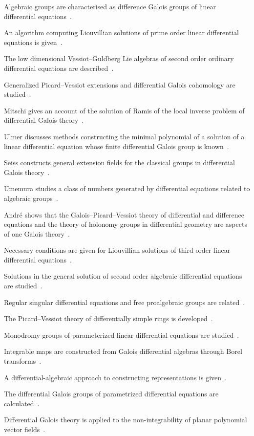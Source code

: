 Algebraic groups are characterised as difference Galois groups of linear
differential equations~\cite{WlAlgebraicGroupsAsDifferenceGal2020}.

An algorithm computing Liouvillian solutions of prime order linear
differential equations is given~\cite{WlAnAlgorithmToComputeLiouvillia2020}.

The low dimensional Vessiot--Guldberg Lie algebras of second order ordinary
differential equations are
described~\cite{WlLowDimensionalVessiotGuldbergL2020}.

Generalized Picard--Vessiot extensions and differential Galois cohomology are
studied~\cite{WlGeneralizedPicardVessiotExtens2020}.

Mitschi gives an account of the solution of Ramis of the local inverse problem of
differential Galois theory~\cite{WlOnRamisSSolutionOfTheLocalInve2020}.

Ulmer discusses methods constructing the minimal polynomial of a solution of a
linear differential equation whose finite differential Galois group is
known~\cite{WlNoteOnAlgebraicSolutionsOfDiff2020}.

Seiss constructs general extension fields for the classical groups in
differential Galois theory~\cite{WlOnGeneralExtensionFieldsForThe2020}.

Umemura studies a class of numbers generated by differential equations related
to algebraic groups~\cite{WlOnAClassOfNumbersGeneratedByDi2020}.

Andr\'e shows that the Galois--Picard--Vessiot theory of differential and
difference equations and the theory of holonomy groups in differential
geometry are aspects of one Galois
theory~\cite{WlNoncommutativeDifferentialsAnd2020}.

Necessary conditions are given for Liouvillian solutions of third order linear
differential equations~\cite{WlNecessaryConditionsForLiouvill2020}.

Solutions in the general solution of second order algebraic differential
equations are studied~\cite{WlSolutionsInTheGeneralSolutionO2020}.

Regular singular differential equations and free proalgebraic groups are
related~\cite{WlRegularSingularDifferentialEqu2020}.

The Picard--Vessiot theory of differentially simple rings is
developed~\cite{WlPicardVessiotTheoryOfDifferent2020}.

Monodromy groups of parameterized linear differential equations are
studied~\cite{WlMonodromyGroupsOfParameterized2020}.

Integrable maps are constructed from Galois differential algebras through
Borel transforms~\cite{WlIntegrableMapsFromGaloisDiffer2020}.

A differential-algebraic approach to constructing representations is
given~\cite{WlDifferentialAlgebraicApproachT2020}.

The differential Galois groups of parametrized differential equations are
calculated~\cite{WlCalculatingDifferentialGaloisG2020}.

Differential Galois theory is applied to the non-integrability of planar
polynomial vector fields~\cite{WlDifferentialGaloisTheoryAndNon2020}.
